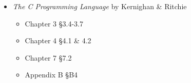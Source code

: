\documentclass[11pt]{article}
\begin{document}
\begin{itemize} 
  \item \textit{The C Programming Language} by Kernighan \& Ritchie 
  \begin{itemize} 
    \item Chapter 3 \S 3.4-3.7
    \item Chapter 4 \S 4.1 \& 4.2
    \item Chapter 7 \S 7.2
    \item Appendix B \S B4 
  \end{itemize} 
\end{itemize} 
 
\end{document}
